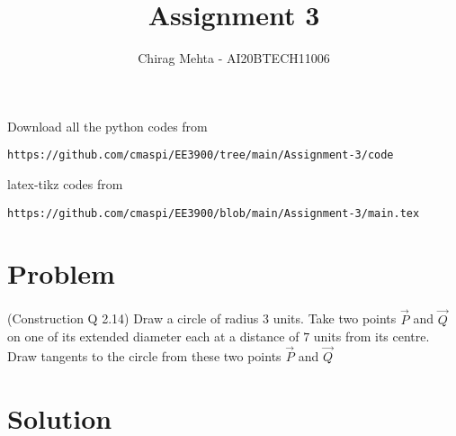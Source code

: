 \documentclass[journal,12pt,twocolumn]{IEEEtran}
\begin{document}
     \def\rightbox#1{\makebox[0in][r]{#1}}
     \def\centbox#1{\makebox[0in]{#1}}
     \def\topbox#1{\raisebox{-\baselineskip}[0in][0in]{#1}}
     \def\midbox#1{\raisebox{-0.5\baselineskip}[0in][0in]{#1}}
\vspace{3cm}
\title{Assignment 3}
\author{Chirag Mehta - AI20BTECH11006}
\maketitle
\newpage
\bigskip
\renewcommand{\thefigure}{\theenumi}
\renewcommand{\thetable}{\theenumi}
Download all the python codes from
\begin{lstlisting}
https://github.com/cmaspi/EE3900/tree/main/Assignment-3/code
\end{lstlisting}
latex-tikz codes from 
\begin{lstlisting}
https://github.com/cmaspi/EE3900/blob/main/Assignment-3/main.tex
\end{lstlisting}
\section{Problem}
(Construction Q 2.14) Draw a circle of radius 3 units.
Take two points $\vec{P}$ and $\vec{Q}$ on one of its extended 
diameter each at a distance of $7$ units from its centre.
Draw tangents to the circle from these two points $\vec{P}$ and $\vec{Q}$ 
\section{Solution}
\end{document}
